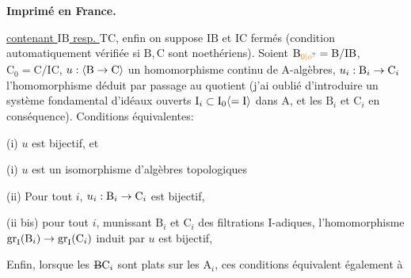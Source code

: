 \centerline{\textbf{Imprimé en France.}}

\uline{contenant $\mathrm{IB}$ resp. $\mathrm{TC}$}\handwritten{$] /^{\circ}$}, enfin on suppose $\mathrm{IB}$ et $\mathrm{IC}$ fermés (condition automatiquement vérifiée si $\mathrm B,\mathrm C$ sont noethériens). Soient $\mathrm B_{\unsure{0|o}}=\mathrm B/\mathrm{IB}$, $\mathrm C_0=\mathrm C/\mathrm{IC}$, $u:\inserted{\mathrm B\handwritten{\to}\mathrm C}$ un homomorphisme continu de $\mathrm A$-algèbres, $u_i:\mathrm B_i\to\mathrm C_i$ l’homomorphisme  déduit par passage au quotient (j’ai oublié d’introduire un système fondamental d’idéaux ouverts $\mathrm I_i\handwritten{\subset}\mathrm I_0\inserted{=\mathrm I}$ dans $\mathrm A$, et les $\mathrm B_i$ et $\mathrm C_i$ en conséquence). Conditions équivalentes:

(i) $u$ est  bijectif, et \handwritten{$\uparrow$}

\handwritten{$\curvearrowright$}(i) $u$ est un isomorphisme d’algèbres topologiques

(ii) Pour tout $i$, $u_i:\mathrm B_i\to\mathrm C_i$ est bijectif, \handwritten{$\uparrow$}

(ii bis) pour tout $i$, munissant $\mathrm B_i$ et $\mathrm C_i$ des filtrations $\mathrm I$-adiques, l’homomorphisme $\operatorname{gr}_{\mathrm I}(\mathrm B_i)\to\operatorname{gr}_{\mathrm I}(\mathrm C_i)$ induit par $u$ est bijectif, \handwritten{$\uparrow$}

Enfin, lorsque les $\deleted{\mathrm B}\handwritten{\mathrm C}_i$ sont plats sur les $\mathrm A_i$, ces conditions équivalent également à

